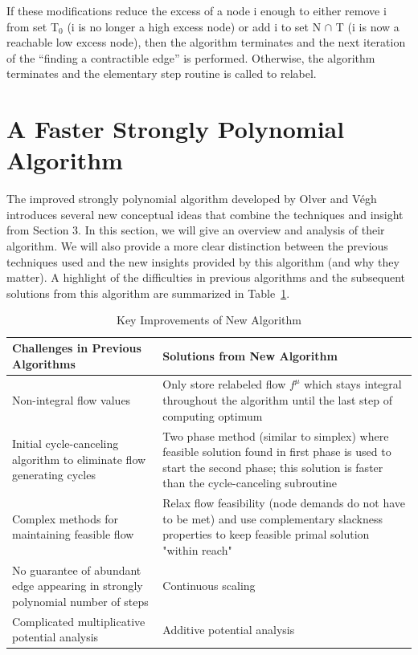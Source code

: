 \documentclass[11pt]{article}
\theoremstyle{definition}
\theoremstyle{definition}
\begin{document}
	If these modifications reduce the excess of a node i enough to either remove i from set T$_0$ (i is no longer a high excess node) or add i to set N $\cap$ T (i is now a reachable low excess node), then the algorithm terminates and the next iteration of the ``finding a contractible edge'' is performed. Otherwise, the algorithm terminates and the elementary step routine is called to relabel.

\section{A Faster Strongly Polynomial Algorithm}
The improved strongly polynomial algorithm developed by Olver and Végh \cite{Olver2017}
introduces several new conceptual ideas that combine the techniques and insight from Section 3.
In this section, we will give an overview and analysis of their algorithm. We will also
provide a more clear distinction between the previous techniques used and the new insights
provided by this algorithm (and why they matter). A highlight of the difficulties in
previous algorithms and the subsequent solutions from this algorithm are
summarized in Table~\ref{tab:improvements}.

\begin{table}[H]
\begin{center}
    \begin{tabular}{ | p{7cm} | p{7cm} |}
    \hline
    Challenges in Previous Algorithms  & Solutions from New Algorithm \\ \hline
    Non-integral flow values & Only store relabeled flow $f^{\mu}$ which stays integral throughout the algorithm until the last step of computing optimum \\ \hline
    Initial cycle-canceling algorithm to eliminate flow generating cycles & Two phase method (similar to simplex) where feasible solution found in first phase is used to start the second phase; this solution is faster than the cycle-canceling subroutine \\ \hline
    Complex methods for maintaining feasible flow & Relax flow feasibility (node demands do not have to be met) and use complementary slackness properties to keep feasible primal solution "within reach" \\ \hline
    No guarantee of abundant edge appearing in strongly polynomial number of steps \cite{Radzik2004} &  Continuous scaling\\ \hline
    Complicated multiplicative potential analysis \cite{Vegh2013} & Additive potential analysis \\
    \hline
    \end{tabular}
\end{center}
\caption{Key Improvements of New Algorithm}
\label{tab:improvements}
\end{table}
\end{document}
